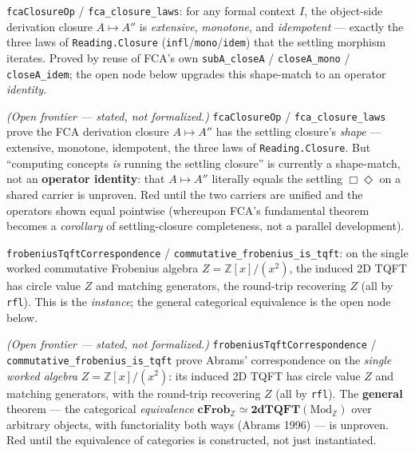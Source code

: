 \begin{theorem}\label{thm:fca-closure-laws}\leanok{}
\texttt{fcaClosureOp} / \texttt{fca\_closure\_laws}: for any formal context $I$, the object-side derivation closure $A\mapsto A''$ is \emph{extensive}, \emph{monotone}, and \emph{idempotent} --- exactly the three laws of \texttt{Reading.Closure} (\texttt{infl}/\texttt{mono}/\texttt{idem}) that the settling morphism iterates. Proved by reuse of FCA's own \texttt{subA\_closeA} / \texttt{closeA\_mono} / \texttt{closeA\_idem}; the open node below upgrades this shape-match to an operator \emph{identity}.
\end{theorem}
\begin{theorem}\label{thm:fca-closure-eq-settling}\notready{}
\emph{(Open frontier --- stated, not formalized.)} \texttt{fcaClosureOp} / \texttt{fca\_closure\_laws} prove the FCA derivation closure $A \mapsto A''$ has the settling closure's \emph{shape} --- extensive, monotone, idempotent, the three laws of \texttt{Reading.Closure}. But ``computing concepts \emph{is} running the settling closure'' is currently a shape-match, not an \textbf{operator identity}: that $A \mapsto A''$ literally equals the settling $\Box\Diamond$ on a shared carrier is unproven. Red until the two carriers are unified and the operators shown equal pointwise (whereupon FCA's fundamental theorem becomes a \emph{corollary} of settling-closure completeness, not a parallel development).
\end{theorem}
\begin{theorem}\label{thm:frobenius-tqft-instance}\leanok{}
\texttt{frobeniusTqftCorrespondence} / \texttt{commutative\_frobenius\_is\_tqft}: on the single worked commutative Frobenius algebra $Z=\mathbb{Z}[x]/(x^2)$, the induced 2D TQFT has circle value $Z$ and matching generators, the round-trip recovering $Z$ (all by \texttt{rfl}). This is the \emph{instance}; the general categorical equivalence is the open node below.
\end{theorem}
\begin{theorem}\label{thm:abrams-equivalence-general}\notready{}
\emph{(Open frontier --- stated, not formalized.)} \texttt{frobeniusTqftCorrespondence} / \texttt{commutative\_frobenius\_is\_tqft} prove Abrams' correspondence on the \emph{single worked algebra} $Z = \mathbb{Z}[x]/(x^2)$: its induced 2D TQFT has circle value $Z$ and matching generators, with the round-trip recovering $Z$ (all by \texttt{rfl}). The \textbf{general} theorem --- the categorical \emph{equivalence} $\mathbf{cFrob}_\mathbb{Z} \simeq \mathbf{2dTQFT}(\mathrm{Mod}_\mathbb{Z})$ over arbitrary objects, with functoriality both ways (Abrams 1996) --- is unproven. Red until the equivalence of categories is constructed, not just instantiated.
\end{theorem}
